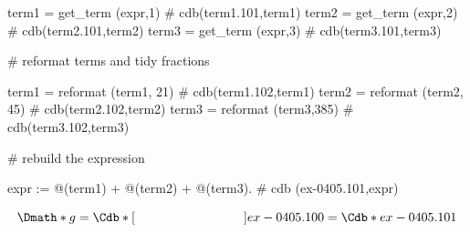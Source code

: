 \documentclass[12pt]{cdblatex}
\begin{document}
\begin{cadabra}
   term1 = get_term (expr,1)        # cdb(term1.101,term1)
   term2 = get_term (expr,2)        # cdb(term2.101,term2)
   term3 = get_term (expr,3)        # cdb(term3.101,term3)

   # reformat terms and tidy fractions

   term1 = reformat (term1, 21)     # cdb(term1.102,term1)
   term2 = reformat (term2, 45)     # cdb(term2.102,term2)
   term3 = reformat (term3,385)     # cdb(term3.102,term3)

   # rebuild the expression

   expr := @(term1) + @(term2) + @(term3).  # cdb (ex-0405.101,expr)

\end{cadabra}

\clearpage

\begin{dgroup*}
   \Dmath*{ g = \Cdb*[\V{15pt}\hskip 3.0cm\hfill]{ex-0405.100}
              = \Cdb*{ex-0405.101} }
\end{dgroup*}
\end{document}
